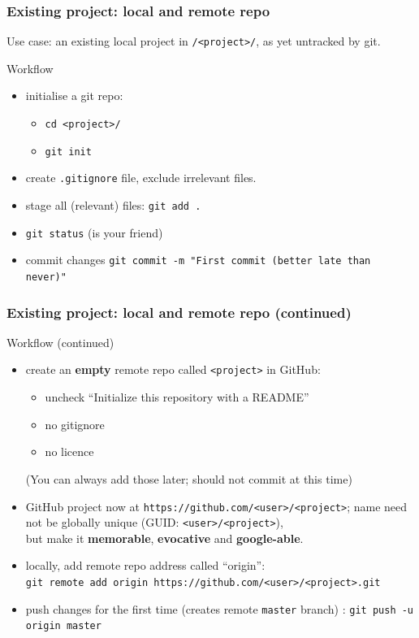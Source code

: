 \documentclass[10pt,svgnames,handout]{beamer}
\begin{document}
\begin{frame}
\frametitle{Existing project: local and remote repo}
Use case: an existing local project in \lstinline{/<project>/}, as yet untracked by git.

\begin{block}{Workflow}
\begin{itemize}
  \item initialise a git repo:
  \begin{itemize}
    \item \lstinline{cd <project>/}
    \item \lstinline{git init}
  \end{itemize}
  \item create \lstinline{.gitignore} file, exclude irrelevant files.
  \item stage all (relevant) files: \lstinline{git add .}
  \item \lstinline{git status} (is your friend)
  \item commit changes \lstinline{git commit -m "First commit (better late than never)"}
\end{itemize}
\end{block}
\end{frame}

\begin{frame}
\frametitle{Existing project: local and remote repo (continued)}

\begin{block}{Workflow (continued)}
\begin{itemize}
  \item create an \textbf{empty} remote repo called \lstinline{<project>} in GitHub:
  \begin{itemize}
    \item uncheck “Initialize this repository with a README”
    \item no gitignore
    \item no licence
  \end{itemize}
  (You can always add those later; should not commit at this time)

  \item GitHub project now at \lstinline{https://github.com/<user>/<project>}; name need not be globally unique (GUID: \lstinline{<user>/<project>}),\\ but make it \textbf{memorable}, \textbf{evocative} and \textbf{google-able}.

  \item locally, add remote repo address called “origin”: \\ {\small \lstinline{git remote add origin https://github.com/<user>/<project>.git}}

  \item push changes for the first time (creates remote \lstinline{master} branch) :
  \lstinline{git push -u origin master}
\end{itemize}
\end{block}
\end{frame}
\end{document}
